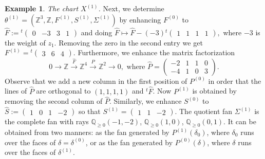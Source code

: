\documentclass[11pt, reqno]{amsart}
\theoremstyle{plain}
\theoremstyle{definition}
\newtheorem{example}[theorem]{Example}
\theoremstyle{remark}
\begin{document}
\begin{example}
\emph{The chart $X^{(1)}$.} Next, we determine $\theta^{(1)} =  (\mathbb{Z}^{3}, \mathbb{Z}, F^{(1)}, S^{(1)}, \Sigma^{(1)})$ by enhancing $F^{(0)}$ to $\widehat{F} :=   {}^{t}\begin{pmatrix}
 0 & -3 & 3 & 1
\end{pmatrix}$ and doing $\widehat{F}  \mapsto \widehat{F} -(-3)  {}^{t}\begin{pmatrix}
 1 & 1 & 1 & 1
\end{pmatrix},$
where $-3$ is the weight of $z_{1}$. Removing the zero in the second entry we get
$F^{(1)} =   {}^{t}\begin{pmatrix} 3 & 6 & 4
\end{pmatrix}.$ Furthermore, we enhance the matrix factorization 
$$0\rightarrow \mathbb{Z}\xrightarrow{\widehat{F}} \mathbb{Z}^{4}\xrightarrow{\widehat{P}}\mathbb{Z}^{2}\rightarrow 0,
\text{ where } \widehat{P} = 
\begin{pmatrix}
-2 & 1 & 1 & 0\\
-4 & 1 & 0 & 3
\end{pmatrix}.$$ Observe that we add a new column in the first position of $P^{(0)}$ in order that the lines of $\widehat{P}$ are orthogonal to $(1,1,1,1)$ and ${}^{t}\widehat{F}$. Now  $P^{(1)}$ is obtained  by removing the second column of $\widehat{P}$. Similarly, we enhance $S^{(0)}$ to $\widehat{S}:= \begin{pmatrix} 1 & 0 & 1 & -2
\end{pmatrix}$ so that $S^{(1)} =   \begin{pmatrix} 1  & 1 & -2
\end{pmatrix}$. The quotient fan $\Sigma^{(1)}$ is the complete fan with rays
$\mathbb{Q}_{\geq 0}(-1,-2)$, $\mathbb{Q}_{\geq 0}(1,0)$, $\mathbb{Q}_{\geq 0}(0,1)$. It can be obtained from two manners:
 as the fan generated by $P^{(1)}(\delta_{0})$, where $\delta_{0}$ runs over the faces of $\delta = \delta^{(0)}$, or as the fan generated by $P^{(0)}(\delta)$, where 
$\delta$ runs over the faces of $\delta^{(1)}$.
\\


\end{example}
\end{document}
